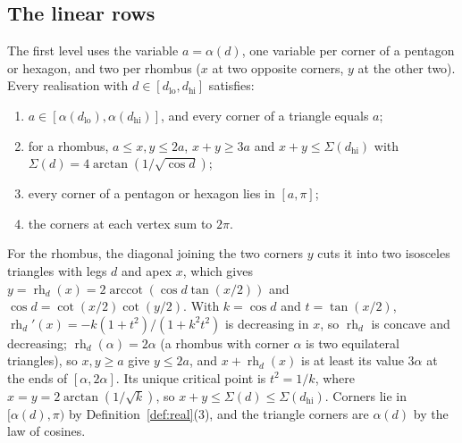 \documentclass[12pt]{amsart}
\theoremstyle{definition}
\theoremstyle{plain}
\theoremstyle{definition}
\newcommand{\dlo}{d_{\mathrm{lo}}}
\newcommand{\dhi}{d_{\mathrm{hi}}}
\newcommand{\leanmap}[1]{\ignorespaces}
\newcommand{\mapnote}[1]{\ignorespaces}
\begin{document}
\subsection{The linear rows}\label{sec:rows}\leanmap{Tammes15.rhombus_rows, Tammes15.rho_concaveOn, Tammes15.rho_strictAntiOn_x, Tammes15.rho_alpha, Tammes15.Ssum_strictMonoOn, Tammes15.alpha_strictMonoOn, Tammes15.equilateral_angle, Tammes15.relSys_of_realisation, Tammes15.vertexSum_of_realisation, Tammes15.vertexSum_realisation, Tammes15.tri_of_realisation, Tammes15.rhombus_of_realisation, Tammes15.tri_of_realisation_proof, Tammes15.rhombus_of_realisation_proof}\mapnote{the rows are fields of the relation system of D3 (Definition \ref{def:relsys})}
The first level uses the variable $a=\alpha(d)$, one variable per corner of a pentagon or hexagon, and two per rhombus ($x$ at two opposite corners, $y$ at the other two). Every realisation with $d\in[\dlo,\dhi]$ satisfies:
\begin{enumerate}
\item $a\in[\alpha(\dlo),\alpha(\dhi)]$, and every corner of a triangle equals $a$;
\item for a rhombus, $a\le x,y\le2a$, $x+y\ge3a$ and $x+y\le \Sigma(\dhi)$ with $\Sigma(d)=4\arctan(1/\sqrt{\cos d})$;
\item every corner of a pentagon or hexagon lies in $[a,\pi]$;
\item the corners at each vertex sum to $2\pi$.
\end{enumerate}
For the rhombus, the diagonal joining the two corners $y$ cuts it into two isosceles triangles with legs $d$ and apex $x$, which gives $y=\operatorname{rh}_d(x)=2\operatorname{arccot}(\cos d\tan(x/2))$ and $\cos d=\cot(x/2)\cot(y/2)$. With $k=\cos d$ and $t=\tan(x/2)$, $\operatorname{rh}_d'(x)=-k(1+t^2)/(1+k^2t^2)$ is decreasing in $x$, so $\operatorname{rh}_d$ is concave and decreasing; $\operatorname{rh}_d(\alpha)=2\alpha$ (a rhombus with corner $\alpha$ is two equilateral triangles), so $x,y\ge a$ give $y\le 2a$, and $x+\operatorname{rh}_d(x)$ is at least its value $3\alpha$ at the ends of $[\alpha,2\alpha]$. Its unique critical point is $t^2=1/k$, where $x=y=2\arctan(1/\sqrt k)$, so $x+y\le \Sigma(d)\le \Sigma(\dhi)$. Corners lie in $[\alpha(d),\pi)$ by Definition~\ref{def:real}(3), and the triangle corners are $\alpha(d)$ by the law of cosines.
\end{document}
